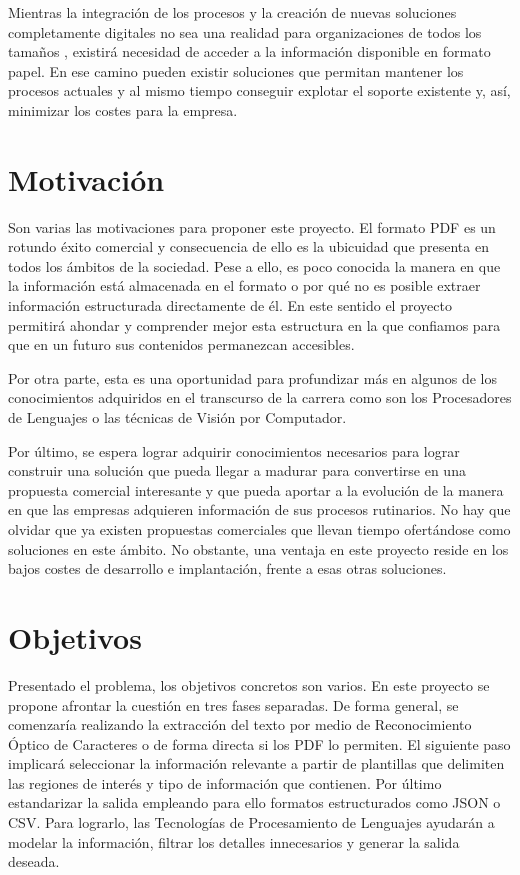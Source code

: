 Mientras la integración de los procesos y la creación de nuevas soluciones completamente digitales \cite{elpais_news_utopiaOficinaSinPapel} no sea una realidad para organizaciones de todos los tamaños \cite{confidencial_news_transformacionOnline}, existirá necesidad de acceder a la información disponible en formato papel. En ese camino pueden existir soluciones que permitan mantener los procesos actuales y al mismo tiempo conseguir explotar el soporte existente y, así, minimizar los costes para la empresa. 

\section{Motivación}

Son varias las motivaciones para proponer este proyecto. El formato PDF es un rotundo éxito comercial y consecuencia de ello es la ubicuidad que presenta en todos los ámbitos de la sociedad. Pese a ello, es poco conocida la manera en que la información está almacenada en el formato o por qué no es posible extraer información estructurada directamente de él. En este sentido el proyecto permitirá ahondar y comprender mejor esta estructura en la que confiamos para que en un futuro sus contenidos permanezcan accesibles.

Por otra parte, esta es una oportunidad para profundizar más en algunos de los conocimientos adquiridos en el transcurso de la carrera como son los Procesadores de Lenguajes o las técnicas de Visión por Computador.

Por último, se espera lograr adquirir conocimientos necesarios para lograr construir una solución que pueda llegar a madurar para convertirse en una propuesta comercial interesante y que pueda aportar a la evolución de la manera en que las empresas adquieren información de sus procesos rutinarios. No hay que olvidar que ya existen propuestas comerciales que llevan tiempo ofertándose como soluciones en este ámbito. No obstante, una ventaja en este proyecto reside en los bajos costes de desarrollo e implantación, frente a esas otras soluciones.

\section{Objetivos} 

Presentado el problema, los objetivos concretos son varios. En este proyecto se propone afrontar la cuestión en tres fases separadas. De forma general, se comenzaría realizando la extracción del texto por medio de Reconocimiento Óptico de Caracteres o de forma directa si los PDF lo permiten. El siguiente paso implicará seleccionar la información relevante a partir de plantillas que delimiten las regiones de interés y tipo de información que contienen. Por último estandarizar la salida empleando para ello formatos estructurados como JSON o CSV. Para lograrlo, las Tecnologías de Procesamiento de Lenguajes ayudarán a modelar la información, filtrar los detalles innecesarios y generar la salida deseada.

